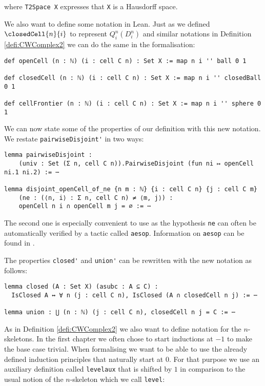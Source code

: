 where \lstinline{T2Space X} expresses that \lstinline{X} is a Hausdorff space.

We also want to define some notation in Lean.
Just as we defined $\closedCell{n}{i}$ to represent $Q^n_i(D_i^n)$ and similar notations in Definition \ref{defi:CWComplex2} we can do the same in the formalisation:

\begin{lstlisting}
def openCell (n : ℕ) (i : cell C n) : Set X := map n i '' ball 0 1

def closedCell (n : ℕ) (i : cell C n) : Set X := map n i '' closedBall 0 1

def cellFrontier (n : ℕ) (i : cell C n) : Set X := map n i '' sphere 0 1
\end{lstlisting}

We can now state some of the properties of our definition with this new notation.
We restate \lstinline{pairwiseDisjoint'} in two ways:

\begin{lstlisting}
lemma pairwiseDisjoint :
    (univ : Set (Σ n, cell C n)).PairwiseDisjoint (fun ni ↦ openCell ni.1 ni.2) := ⋯

lemma disjoint_openCell_of_ne {n m : ℕ} {i : cell C n} {j : cell C m}
    (ne : (⟨n, i⟩ : Σ n, cell C n) ≠ ⟨m, j⟩) :
    openCell n i ∩ openCell m j = ∅ := ⋯
\end{lstlisting}

The second one is especially convenient to use as the hypothesis \lstinline{ne} can often be automatically verified by a tactic called \lstinline{aesop}.
Information on \lstinline{aesop} can be found in \cite{Limperg2023}.

The properties \lstinline{closed'} and \lstinline{union'} can be rewritten with the new notation as follows:

\begin{lstlisting}
lemma closed (A : Set X) (asubc : A ⊆ C) :
  IsClosed A ↔ ∀ n (j : cell C n), IsClosed (A ∩ closedCell n j) := ⋯

lemma union : ⋃ (n : ℕ) (j : cell C n), closedCell n j = C := ⋯
\end{lstlisting}

As in Definition \ref{defi:CWComplex2} we also want to define notation for the $n$-skeletons.
In the first chapter we often chose to start inductions at $-1$ to make the base case trivial.
When formalising we want to be able to use the already defined induction principles that naturally start at $0$.
For that purpose we use an auxiliary definition called \lstinline{levelaux} that is shifted by $1$ in comparison to the usual notion of the $n$-skeleton which we call \lstinline{level}:

